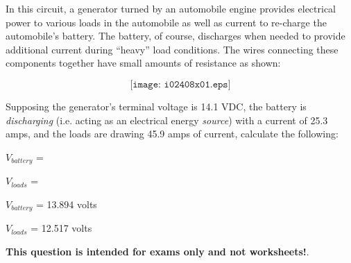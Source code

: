 

In this circuit, a generator turned by an automobile engine provides electrical power to various loads in the automobile as well as current to re-charge the automobile's battery.  The battery, of course, discharges when needed to provide additional current during ``heavy'' load conditions.  The wires connecting these components together have small amounts of resistance as shown:

$$\texttt{[image: i02408x01.eps]}$$

Supposing the generator's terminal voltage is 14.1 VDC, the battery is {\it discharging} (i.e. acting as an electrical energy {\it source}) with a current of 25.3 amps, and the loads are drawing 45.9 amps of current, calculate the following:

\vskip 10pt

$V_{battery}$ = 

\vskip 10pt

$V_{loads}$ = 

\vskip 10pt







$V_{battery}$ = 13.894 volts

\vskip 10pt

$V_{loads}$ = 12.517 volts







{\bf This question is intended for exams only and not worksheets!}.



